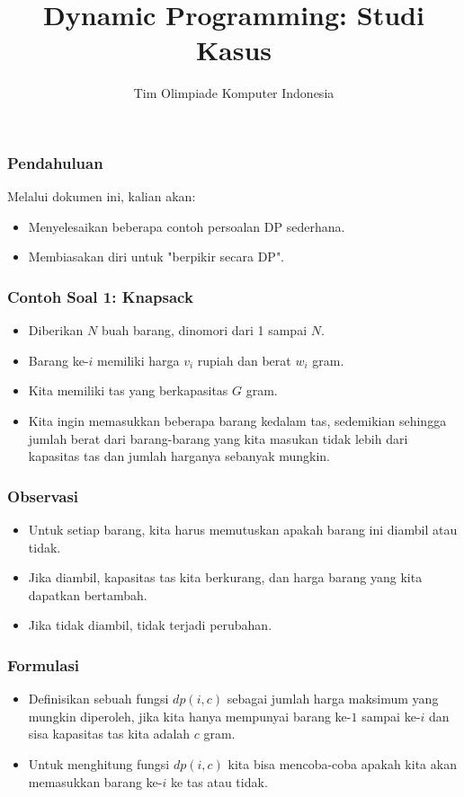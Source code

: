 

\title{Dynamic Programming: \newline Studi Kasus}
\author{Tim Olimpiade Komputer Indonesia}
\date{}

\usepackage{qtree}


\begin{frame}
\titlepage
\end{frame}

\begin{frame}
\frametitle{Pendahuluan}
Melalui dokumen ini, kalian akan:
\begin{itemize}
  \item Menyelesaikan beberapa contoh persoalan DP sederhana.
  \item Membiasakan diri untuk "berpikir secara DP".
\end{itemize}
\end{frame}

\begin{frame} 
\frametitle{Contoh Soal 1: Knapsack}
\begin{itemize}
  \item Diberikan $N$ buah barang, dinomori dari 1 sampai $N$. 
  \item Barang ke-$i$ memiliki harga $v_i$ rupiah dan berat $w_i$ gram. 
  \item Kita memiliki tas yang berkapasitas $G$ gram. 
  \item Kita ingin memasukkan beberapa barang kedalam tas, sedemikian sehingga jumlah berat dari barang-barang yang kita masukan tidak lebih dari kapasitas tas dan jumlah harganya sebanyak mungkin.
\end{itemize}
\end{frame}

\begin{frame} 
\frametitle{Observasi}
\begin{itemize}
  \item Untuk setiap barang, kita harus memutuskan apakah barang ini diambil atau tidak.
  \item Jika diambil, kapasitas tas kita berkurang, dan harga barang yang kita dapatkan bertambah.
  \item Jika tidak diambil, tidak terjadi perubahan.
\end{itemize}
\end{frame}

\begin{frame} 
\frametitle{Formulasi}
\begin{itemize}
  \item Definisikan sebuah fungsi $dp(i,c)$ sebagai jumlah harga maksimum yang mungkin diperoleh, jika kita hanya mempunyai barang ke-$1$ sampai ke-$i$ dan sisa kapasitas tas kita adalah $c$ gram.
  \item Untuk menghitung fungsi $dp(i,c)$ kita bisa mencoba-coba apakah kita akan memasukkan barang ke-$i$ ke tas atau tidak.
\end{itemize}
\end{frame}

